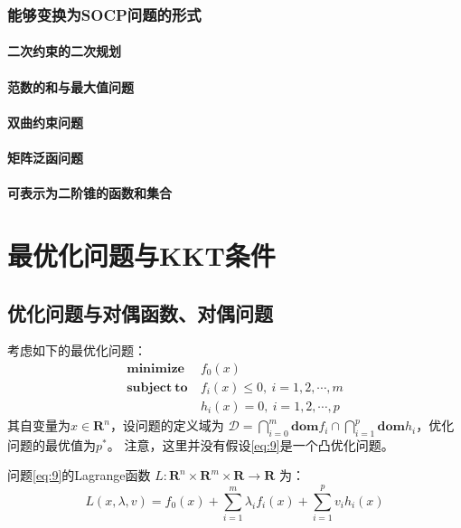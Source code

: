 \documentclass[fontset=none,oneside]{book}
\begin{document}
\subsection{能够变换为SOCP问题的形式}
\subsubsection{二次约束的二次规划}
\subsubsection{范数的和与最大值问题}
\subsubsection{双曲约束问题}
\subsubsection{矩阵泛函问题}
\subsubsection{可表示为二阶锥的函数和集合}

\chapter{最优化问题与KKT条件}
\section{优化问题与对偶函数、对偶问题}
考虑如下的最优化问题：
\begin{equation}
\label{eq:9}
\begin{split}
\mathbf{minimize ~} & f_{0}(x) \\
\mathbf{subject~to~}& f_{i}(x)\leq 0,~i=1,2,\cdots,m \\
                    & h_{i}(x)=0,~i=1,2,\cdots,p
\end{split}
\end{equation}
其自变量为$x\in \mathbf{R}^{n}$，设问题的定义域为
$\mathcal{D}=\bigcap\limits_{i=0}^{m}\mathbf{dom} f_{i} \cap
\bigcap\limits_{i=1}^{p}\mathbf{dom} h_{i}$，优化问题的最优值为$p^{*}$。
注意，这里并没有假设\eqref{eq:9}是一个凸优化问题。

问题\eqref{eq:9}的Lagrange函数
$L:\mathbf{R}^{n}\times\mathbf{R}^{m}\times\mathbf{R}\rightarrow\mathbf{R}$
为：
\begin{equation}
\label{eq:10}
L(x,\lambda,v)=f_{0}(x)+\sum\limits_{i=1}^{m}\lambda_{i}f_{i}(x)+\sum\limits_{i=1}^{p}v_{i}h_{i}(x)
\end{equation}
\end{document}
